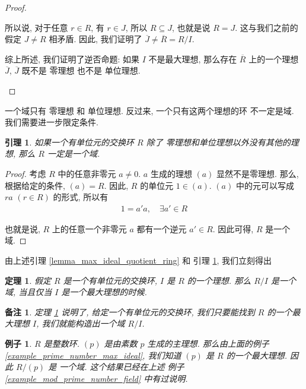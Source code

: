 \documentclass[utf8]{ctexbook}
\newtheorem{theorem}{定理}[section]
\newtheorem{memo}{备注}[section]
\newtheorem{example}{例子}[section]
\newtheorem{lemma}{引理}[section]
\begin{document}
\begin{proof}
\begin{itemize}
{\begin{enumerate}
{所以说, 对于任意 $r \in R$, 有 $r \in J$, 所以 $R \subseteq J$, 也就是说 $R = J$. 这与我们之前的假定 $J \neq R$ 相矛盾. 因此, 我们证明了 $\overline{J} \neq \overline{R} = R/I$.}
\end{enumerate}

综上所述, 我们证明了逆否命题: 如果 $I$ 不是最大理想, 那么存在 $\overline{R}$ 上的一个理想 $\overline{J}$, $\overline{J}$ 既不是 零理想  也不是 单位理想.
}
\end{itemize}
\end{proof}

一个域只有 零理想 和 单位理想. 反过来, 一个只有这两个理想的环 不一定是域. 我们需要进一步限定条件.

\begin{lemma}\label{lemma_max_ideal_to_field}
如果一个有单位元的交换环 $R$ 除了 零理想和单位理想以外没有其他的理想, 那么 $R$ 一定是一个域.
\end{lemma}

\begin{proof}
考虑 $R$ 中的任意非零元 $a \neq 0$. $a$ 生成的理想 $(a)$ 显然不是零理想. 那么, 根据给定的条件, $(a) = R$. 因此, $R$ 的单位元 $1 \in (a)$. $(a)$ 中的元可以写成 $ra $ $(r \in R)$ 的形式, 所以有
\begin{align*}
1 = a' a, \quad \exists a' \in R
\end{align*}

也就是说, $R$ 上的任意一个非零元 $a$ 都有一个逆元 $a' \in R$. 因此可得, $R$ 是一个域.
\end{proof}

由上述引理 \ref{lemma_max_ideal_quotient_ring} 和 引理 \ref{lemma_max_ideal_to_field}, 我们立刻得出


\begin{theorem}\label{theorem_max_ideal_to_field}
假定 $R$ 是一个有单位元的交换环, $I$ 是 $R$ 的一个理想. 那么 $R/I$ 是一个域, 当且仅当 $I$ 是一个最大理想的时候.
\end{theorem}

\begin{memo}
定理 \ref{theorem_max_ideal_to_field} 说明了, 给定一个有单位元的交换环, 我们只要能找到 $R$ 的一个最大理想 $I$, 我们就能构造出一个域 $R/I$.
\end{memo}

\begin{example}
$R$ 是整数环. $(p)$ 是由素数 $p$ 生成的主理想. 那么由上面的例子 \ref{example_prime_number_max_ideal}, 我们知道 $(p)$ 是 $R$ 的一个最大理想. 因此 $R/(p)$ 是 一个域. 这个结果已经在上述 例子 \ref{example_mod_prime_number_field} 中有过说明.
\end{example}
\end{document}
